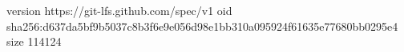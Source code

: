 version https://git-lfs.github.com/spec/v1
oid sha256:d637da5bf9b5037c8b3f6e9e056d98e1bb310a095924f61635e77680bb0295e4
size 114124
